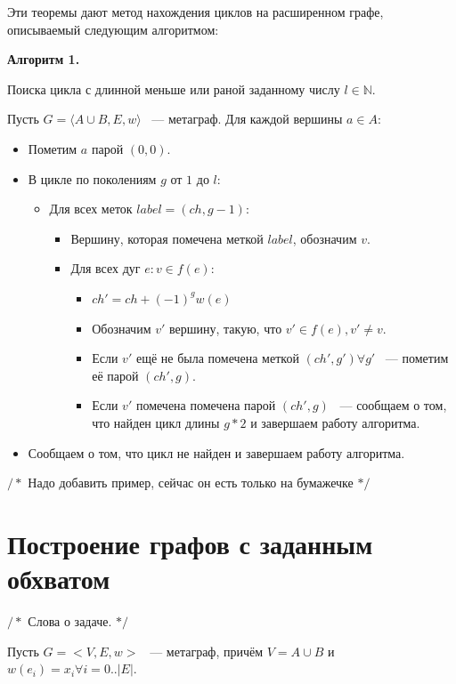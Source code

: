 \documentclass[14pt]{mmcs-article}
\begin{document}
Эти теоремы дают метод нахождения циклов на расширенном графе, описываемый следующим алгоритмом:

\textbf{Алгоритм 1.}

Поиска цикла с длинной меньше или раной заданному числу $l \in \mathbb{N}$.

Пусть $G = \langle A \cup B, E,w\rangle$ ~--- метаграф. Для каждой вершины $a \in A:$

\begin{itemize}
    \item Пометим $a$ парой $(0, 0)$.
    \item В цикле по поколениям $g$ от $1$ до $l$:
      \begin{itemize}
      \item Для всех меток $label = (ch, g - 1)$:
        \begin{itemize}
        \item Вершину, которая помечена меткой $label$, обозначим $v$.
        \item Для всех дуг $e: v \in f(e)$:
          \begin{itemize}
          \item $ch' = ch + (-1)^{g} w(e)$
          \item Обозначим $v'$ вершину, такую, что $v' \in f(e), v' \neq v$.
          \item Если $v'$ ещё не была помечена меткой $(ch', g') \forall g'$ ~--- пометим её парой $(ch', g)$.
          \item Если $v'$ помечена помечена парой $(ch', g)$ ~--- сообщаем о том, что найден цикл длины $g * 2$ и завершаем работу алгоритма.
          \end{itemize}
        \end{itemize}
      \end{itemize}
    \item Сообщаем о том, что цикл не найден и завершаем работу алгоритма.
\end{itemize}

$/*$ Надо добавить пример, сейчас он есть только на бумажечке $*/$

\pagebreak
\section*{Построение графов с заданным обхватом}

$/*$ Слова о задаче. $*/$


Пусть $G = <V, E, w>$ ~--- метаграф, причём $V = A \cup B$ и $w(e_i) = x_i \forall i = 0..|E|$.
\end{document}
